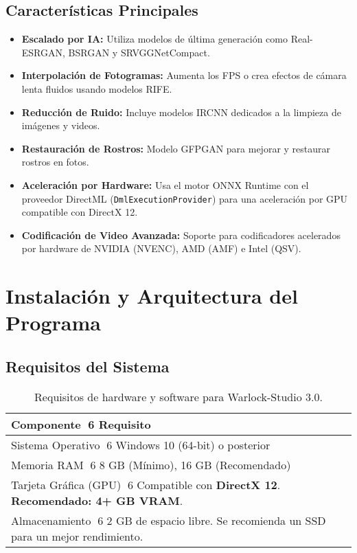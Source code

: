 \documentclass[11pt, a4paper]{article}
\begin{document}
\subsection{Características Principales}
\begin{itemize}[leftmargin=*]
    \item \textbf{Escalado por IA:} Utiliza modelos de última generación como Real-ESRGAN, BSRGAN y SRVGGNetCompact.
    \item \textbf{Interpolación de Fotogramas:} Aumenta los FPS o crea efectos de cámara lenta fluidos usando modelos RIFE.
    \item \textbf{Reducción de Ruido:} Incluye modelos IRCNN dedicados a la limpieza de imágenes y videos.
    \item \textbf{Restauración de Rostros:} Modelo GFPGAN para mejorar y restaurar rostros en fotos.
    \item \textbf{Aceleración por Hardware:} Usa el motor ONNX Runtime con el proveedor DirectML (\texttt{DmlExecutionProvider}) para una aceleración por GPU compatible con DirectX 12.
    \item \textbf{Codificación de Video Avanzada:} Soporte para codificadores acelerados por hardware de NVIDIA (NVENC), AMD (AMF) e Intel (QSV).
\end{itemize}


\section{Instalación y Arquitectura del Programa}

\subsection{Requisitos del Sistema}
\begin{table}[H]
    \centering %
    \begin{tabular}{ll}
        \toprule %
        \textbf{Componente} 6 \textbf{Requisito} \\
        \midrule %
        Sistema Operativo 6 Windows 10 (64-bit) o posterior \\
        Memoria RAM 6 8 GB (Mínimo), 16 GB (Recomendado) \\
        Tarjeta Gráfica (GPU) 6 Compatible con \textbf{DirectX 12}. \textbf{Recomendado: 4+ GB VRAM}. \\
        Almacenamiento 6 2 GB de espacio libre. Se recomienda un SSD para un mejor rendimiento. \\
        \bottomrule %
    \end{tabular}
    \caption{Requisitos de hardware y software para Warlock-Studio 3.0.}
\end{table}
\end{document}
